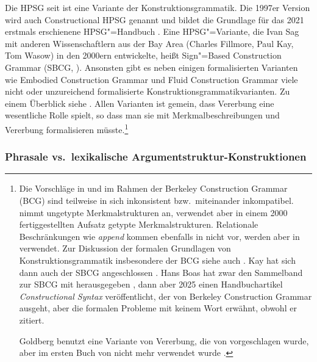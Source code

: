 Die HPSG seit  ist eine Variante der Konstruktionsgrammatik. Die 1997er Version wird auch Constructional HPSG genannt und bildet
die Grundlage für das 2021 erstmals erschienene HPSG"=Handbuch \citep*{HPSGHandbook}. Eine
HPSG"=Variante, die Ivan Sag mit anderen Wissenschaftlern aus der Bay Area (Charles Fillmore, Paul
Kay, Tom Wasow) in den 2000ern entwickelte, heißt Sign"=Based Construction Grammar
(SBCG,
\citealt{Sag2010b,Sag2012a}). Ansonsten gibt es neben einigen formalisierten Varianten wie Embodied
Construction Grammar \citep{BC2005a} und Fluid Construction Grammar
\citep{SDB2006a-u,SteelsFluid-ed,vanTrijp2013a} viele
nicht oder unzureichend formalisierte Konstruktionsgrammatikvarianten. Zu einem Überblick siehe
\citep{MuellerCxG}. Allen Varianten ist gemein, dass
Vererbung eine wesentliche Rolle spielt, so dass man sie mit Merkmalbeschreibungen und Vererbung
formalisieren müsste.\footnote{%
  Die Vorschläge in  und  im Rahmen der Berkeley
  Construction Grammar (BCG) sind teilweise in sich inkonsistent bzw.\ miteinander inkompatibel.
\citet{Kay2002a} nimmt ungetypte Merkmalstrukturen an,
  verwendet aber in einem 2000 fertiggestellten Aufsatz \citep{Kay2005a} getypte Merkmalstrukturen. Relationale Beschränkungen
  wie \emph{append} kommen ebenfalls in  nicht vor, werden aber in 
  verwendet. 
  Zur Diskussion der formalen Grundlagen von Konstruktionsgrammatik insbesondere der BCG siehe auch . Kay hat sich dann auch der SBCG angeschlossen
    \citep*{SBK2012a}. Hans Boas hat zwar den Sammelband zur SBCG mit
    herausgegeben \citep{BS2012a-ed}, dann aber 2025 einen Handbuchartikel \emph{Constructional
      Syntax} veröffentlicht, der von Berkeley Construction Grammar ausgeht, aber die formalen
    Probleme mit keinem Wort erwähnt, obwohl er  zitiert.

Goldberg benutzt eine Variante von Vererbung, die von \citet*[263]{FPW85a} vorgeschlagen wurde,
aber im ersten Buch von \citet{ps} nicht mehr verwendet wurde \citep[309]{GoldbergShirtz2025a}.%
}
\largerpage

\subsubsection{Phrasale vs.\ lexikalische Argumentstruktur-Konstruktionen}
\label{sec-phrasal-lexikalisch-rc}

